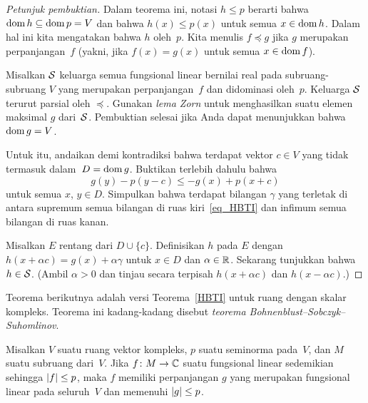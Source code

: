 \begin{proof}[\emph{Petunjuk pembuktian}] Dalam teorema ini, notasi $h \le p$ berarti bahwa $\operatorname{dom} h \subseteq \operatorname{dom} p = V$
dan bahwa $h(x) \le p(x)$ untuk semua $x \in \operatorname{dom} h$. Dalam hal ini kita mengatakan bahwa $h$
 oleh~$p$. Kita menulis
$f \preccurlyeq g$ jika $g$ merupakan perpanjangan~$f$ (yakni,
jika $f(x) = g(x)$ untuk semua $x \in \operatorname{dom} f$).

Misalkan $\mathcal{S}$ keluarga semua fungsional linear bernilai real pada subruang-subruang $V$ yang merupakan perpanjangan~$f$ dan
didominasi oleh~$p$. Keluarga $\mathcal{S}$ terurut parsial oleh $\preccurlyeq$. Gunakan \emph{lema Zorn} untuk menghasilkan suatu
elemen maksimal $g$ dari~$\mathcal{S}$. Pembuktian selesai jika Anda dapat menunjukkan bahwa $\operatorname{dom}{g} = V$.

Untuk itu, andaikan demi kontradiksi bahwa terdapat vektor $c \in V$ yang tidak termasuk dalam~$D = \operatorname{dom}{g}$. Buktikan terlebih dahulu bahwa
   \begin{equation}\label{eq_HBTI}
      g(y) - p(y - c) \le - g(x) + p(x + c)
   \end{equation}
untuk semua $x$, $y \in D$. Simpulkan bahwa terdapat bilangan $\gamma$ yang terletak di antara supremum semua bilangan
di ruas kiri~\eqref{eq_HBTI} dan infimum semua bilangan di ruas kanan.

Misalkan $E$ rentang dari $D \cup \{c\}$. Definisikan $h$ pada $E$ dengan $h(x + \alpha c) = g(x) + \alpha\gamma$ untuk $x \in D$ dan
$\alpha \in \mathbb{R}$. Sekarang tunjukkan bahwa $h \in \mathcal{S}$. (Ambil $\alpha > 0$ dan tinjau secara terpisah $h(x + \alpha c)$ dan $h(x - \alpha c)$.) \ns
\end{proof}

Teorema berikutnya adalah versi Teorema~\ref{HBTI} untuk ruang dengan skalar kompleks. Teorema ini kadang-kadang disebut
\emph{teorema Bohnenblust--Sobczyk--Suhomlinov}.

\begin{thm}\label{HBTII} Misalkan $V$ suatu ruang vektor kompleks, $p$ suatu seminorma pada~$V$, dan $M$ suatu subruang dari~$V$.
Jika $f\colon M \rightarrow \mathbb{C}$ suatu fungsional linear sedemikian sehingga $\lvert f\rvert \le p$, maka $f$ memiliki perpanjangan $g$ yang merupakan fungsional linear
pada seluruh~$V$ dan memenuhi $\lvert g\rvert \le p$.
\end{thm}

